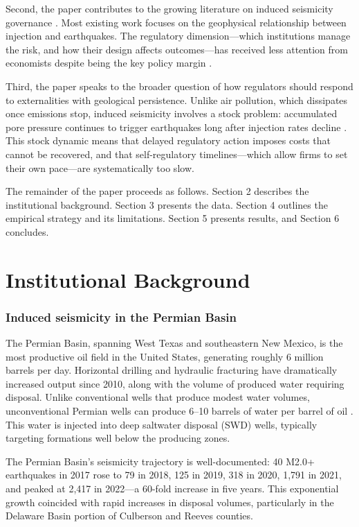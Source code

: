\documentclass[12pt]{article}
\begin{document}
Second, the paper contributes to the growing literature on induced seismicity governance \citep{rubinstein2015myths, atkinson2020developments, schultz2020induced}. Most existing work focuses on the geophysical relationship between injection and earthquakes. The regulatory dimension---which institutions manage the risk, and how their design affects outcomes---has received less attention from economists despite being the key policy margin \citep{kozlowski2020induced, frohlich2016historical}.

Third, the paper speaks to the broader question of how regulators should respond to externalities with geological persistence. Unlike air pollution, which dissipates once emissions stop, induced seismicity involves a stock problem: accumulated pore pressure continues to trigger earthquakes long after injection rates decline \citep{keranen2018induced}. This stock dynamic means that delayed regulatory action imposes costs that cannot be recovered, and that self-regulatory timelines---which allow firms to set their own pace---are systematically too slow.

The remainder of the paper proceeds as follows. Section 2 describes the institutional background. Section 3 presents the data. Section 4 outlines the empirical strategy and its limitations. Section 5 presents results, and Section 6 concludes.

\section{Institutional Background}

\subsubsection*{Induced seismicity in the Permian Basin} The Permian Basin, spanning West Texas and southeastern New Mexico, is the most productive oil field in the United States, generating roughly 6 million barrels per day. Horizontal drilling and hydraulic fracturing have dramatically increased output since 2010, along with the volume of produced water requiring disposal. Unlike conventional wells that produce modest water volumes, unconventional Permian wells can produce 6--10 barrels of water per barrel of oil \citep{scanlon2020can}. This water is injected into deep saltwater disposal (SWD) wells, typically targeting formations well below the producing zones.

The Permian Basin's seismicity trajectory is well-documented: 40 M2.0+ earthquakes in 2017 rose to 79 in 2018, 125 in 2019, 318 in 2020, 1,791 in 2021, and peaked at 2,417 in 2022---a 60-fold increase in five years. This exponential growth coincided with rapid increases in disposal volumes, particularly in the Delaware Basin portion of Culberson and Reeves counties.
\end{document}

